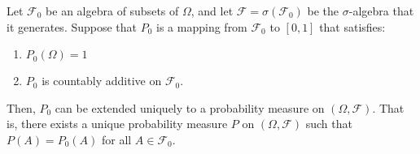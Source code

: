 \begin{theorem}
    Let \( \mathcal{F}_0 \) be an algebra of subsets of \( \Omega \), and let \( \mathcal{F} = \sigma(\mathcal{F}_0) \) be the \( \sigma \)-algebra that it generates. Suppose that \( P_0 \) is a mapping from \( \mathcal{F}_0 \) to \([0, 1]\) that satisfies:
    \begin{enumerate}
        \item \( P_0(\Omega) = 1 \)
        \item \( P_0 \) is countably additive on \( \mathcal{F}_0 \). 
    \end{enumerate}
    Then, \( P_0 \) can be extended uniquely to a probability measure on \( (\Omega, \mathcal{F}) \). That is, there exists a unique probability measure \( P \) on \( (\Omega, \mathcal{F}) \) such that \( P(A) = P_0(A) \) for all \( A \in \mathcal{F}_0 \).
    \end{theorem}
    
